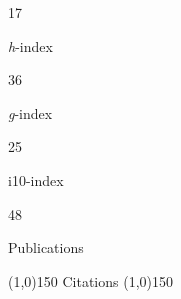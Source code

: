 \documentclass[11pt,a4paper,]{awesome-cv}
\begin{document}
\begin{tcolorbox}[enhanced,
  on line,
  boxsep=4pt, left=0pt,right=0pt,top=0pt,bottom=0pt,
  colframe=white,colback=teal,
  hyperurl={https://scholar.google.com/citations?user=8Q0jKHsAAAAJ}]

\color{white}
  \begin{minipage}[c]{0.245\linewidth}
    \begin{center}
      \begin{huge} 17 \end{huge}
      \begin{small} \textit{h}-index \end{small}
    \end{center}
  \end{minipage}
  \begin{minipage}[c]{0.245\linewidth}
    \begin{center}
      \begin{huge} 36 \end{huge}
      \begin{small} \textit{g}-index \end{small}
    \end{center}
  \end{minipage}
  \begin{minipage}[c]{0.245\linewidth}
    \begin{center}
      \begin{huge} 25 \end{huge}
      \begin{small} i10-index \end{small}
    \end{center}
  \end{minipage}
  \begin{minipage}[c]{0.245\linewidth}
    \begin{center}
      \begin{huge} 48 \end{huge}
      \begin{small} Publications \end{small}
    \end{center}
  \end{minipage}

  \begin{center} \noindent\line(1,0){150} Citations \noindent\line(1,0){150} \end{center}


\end{tcolorbox}
\end{document}
